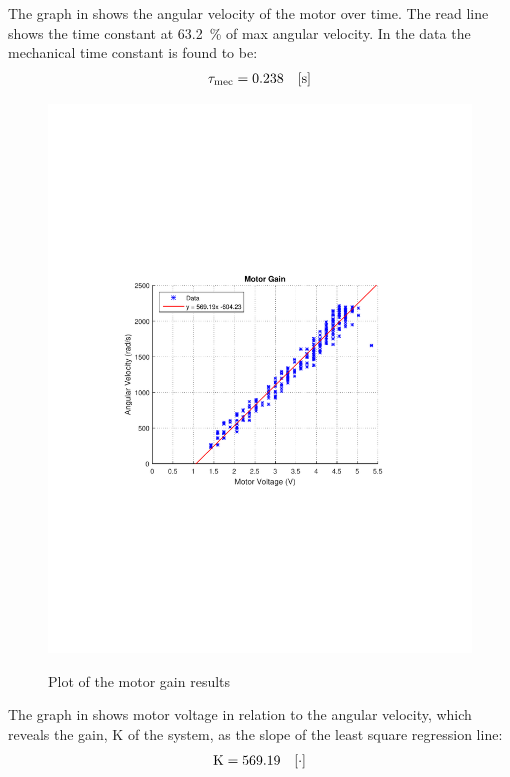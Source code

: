 The graph in  shows the angular velocity of the motor over time. The read line shows the time constant at \si{\num{63.2} \%} of max angular velocity. In the data the mechanical time constant is found to be:
%
\begin{align}
  \eq{\tau_{mec}}{\num{0.238}} \unit{s}\nonumber
\end{align}

\begin{figure}[H]
  \centering
  {
    \includegraphics[width=.8\textwidth]{figures/motorGain.pdf}
  }
	\caption{Plot of the motor gain results}
	\label{motorGain}
\end{figure}

The graph in  shows motor voltage in relation to the angular velocity, which reveals the gain, \si{K} of the system, as the slope of the least square regression line:
%
\begin{align}
  \eq{K}{\num{569.19}} \unit{\cdot}\nonumber
\end{align}
